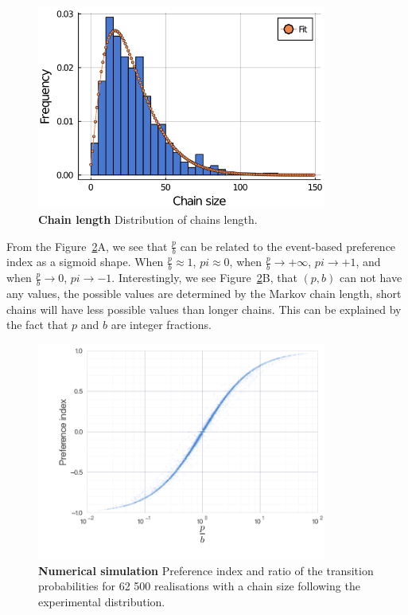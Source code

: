   \begin{figure}[h]
    \centering
    \includegraphics[width=0.85\textwidth]{part_2/assets/chain_fit.png}
    \caption{\textbf{Chain length} Distribution of chains length.}
    \label{chain_fit}
  \end{figure}

  From the Figure~\ref{markov_simu}A, we see that $\frac{p}{b}$ can be related to the event-based preference index as a sigmoid shape. When $\frac{p}{b} \approx 1$,  $pi \approx 0$, when $\frac{p}{b} \to +\infty$, $pi \to +1$, and when $\frac{p}{b} \to 0$, $pi \to -1$. Interestingly, we see Figure~\ref{markov_simu}B, that $(p,b)$ can not have any values, the possible values are determined by the Markov chain length, short chains will have less possible values than longer chains. This can be explained by the fact that $p$ and $b$ are integer fractions.

  \begin{figure}[h]
    \centering
    \includegraphics[width=0.85\textwidth]{part_2/assets/pi_pb.png}
    \caption{\textbf{Numerical simulation} Preference index and ratio of the transition probabilities for 62 500 realisations with a chain size following the experimental distribution.}
    \label{markov_simu}
  \end{figure}

